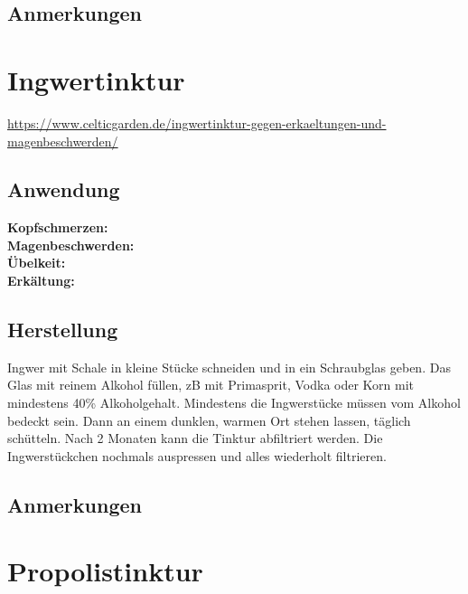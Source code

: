 \subsection{Anmerkungen}



\newpage


\section{Ingwertinktur}


\url{https://www.celticgarden.de/ingwertinktur-gegen-erkaeltungen-und-magenbeschwerden/}

   

\subsection{Anwendung}
\textbf{Kopfschmerzen:} \\ 

\textbf{Magenbeschwerden:} \\ 

\textbf{Übelkeit:} \\ 

\textbf{Erkältung:} \\ 


\subsection{Herstellung}

Ingwer mit Schale in kleine Stücke schneiden und in ein Schraubglas geben. Das Glas mit reinem Alkohol füllen, zB mit Primasprit, Vodka oder Korn mit mindestens 40\% Alkoholgehalt. Mindestens die Ingwerstücke müssen vom Alkohol bedeckt sein. Dann an einem dunklen, warmen Ort stehen lassen, täglich schütteln. Nach 2 Monaten kann die Tinktur abfiltriert werden. Die Ingwerstückchen nochmals auspressen und alles wiederholt filtrieren.

\subsection{Anmerkungen}


\newpage


\section{Propolistinktur}

